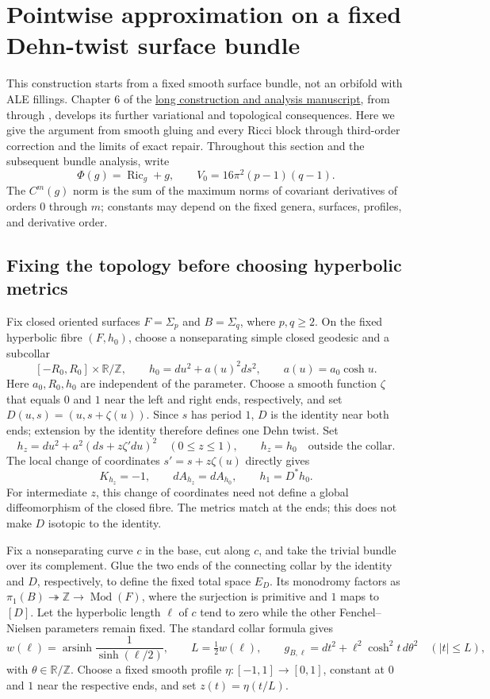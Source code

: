 \documentclass[a4paper,11pt]{article}
\numberwithin{equation}{section}
\theoremstyle{definition}
\newcommand{\Ric}{\operatorname{Ric}}
\newcommand{\R}{\mathbb R}
\newcommand{\Z}{\mathbb Z}
\begin{document}
\section{Pointwise approximation on a fixed Dehn-twist surface bundle}\label{sec:ED}
This construction starts from a fixed smooth surface bundle, not an orbifold with ALE fillings.
Chapter 6 of the \href{20260912.tex}{long construction and analysis manuscript},
from  through , develops its further variational and topological consequences.
Here we give the argument from smooth gluing and every Ricci block through third-order correction and the limits of exact repair.
Throughout this section and the subsequent bundle analysis, write
\[
\Phi(g)=\Ric_g+g,\qquad
V_0=16\pi^2(p-1)(q-1).
\]
The $C^m(g)$ norm is the sum of the maximum norms of covariant derivatives of orders $0$ through $m$;
constants may depend on the fixed genera, surfaces, profiles, and derivative order.

\subsection{Fixing the topology before choosing hyperbolic metrics}\label{sec:ED-object}
Fix closed oriented surfaces $F=\Sigma_p$ and $B=\Sigma_q$, where $p,q\ge2$.
On the fixed hyperbolic fibre $(F,h_0)$, choose a nonseparating simple closed geodesic and a subcollar
\[
[-R_0,R_0]\times\R/\Z,\qquad
h_0=du^2+a(u)^2ds^2,\qquad a(u)=a_0\cosh u.
\]
Here $a_0,R_0,h_0$ are independent of the parameter. Choose a smooth function $\zeta$
that equals $0$ and $1$ near the left and right ends, respectively, and set
$D(u,s)=(u,s+\zeta(u))$. Since $s$ has period $1$, $D$ is the identity near both ends;
extension by the identity therefore defines one Dehn twist. Set
\begin{equation}\label{eq:ED-fiber-path}
h_z=du^2+a^2(ds+z\zeta' du)^2\quad(0\le z\le1),\qquad
h_z=h_0\quad\text{outside the collar}.
\end{equation}
The local change of coordinates $s'=s+z\zeta(u)$ directly gives
\[
K_{h_z}=-1,\qquad dA_{h_z}=dA_{h_0},\qquad h_1=D^*h_0.
\]
For intermediate $z$, this change of coordinates need not define a global diffeomorphism of the closed fibre.
The metrics match at the ends; this does not make $D$ isotopic to the identity.

Fix a nonseparating curve $c$ in the base, cut along $c$, and take the trivial bundle over its complement.
Glue the two ends of the connecting collar by the identity and $D$, respectively, to define the fixed total space $E_D$.
Its monodromy factors as
$\pi_1(B)\twoheadrightarrow\Z\to\operatorname{Mod}(F)$,
where the surjection is primitive and $1$ maps to $[D]$.
Let the hyperbolic length $\ell$ of $c$ tend to zero while the other Fenchel--Nielsen parameters remain fixed.
The standard collar formula \cite[Appendix A]{RupflinToppingCollars} gives
\[
w(\ell)=\operatorname{arsinh}\frac1{\sinh(\ell/2)},\qquad
L=\tfrac12w(\ell),\qquad
g_{B,\ell}=dt^2+\ell^2\cosh^2t\,d\theta^2\quad(|t|\le L),
\]
with $\theta\in\R/\Z$. Choose a fixed smooth profile
$\eta:[-1,1]\to[0,1]$, constant at $0$ and $1$ near the respective ends, and set $z(t)=\eta(t/L)$.
\end{document}

